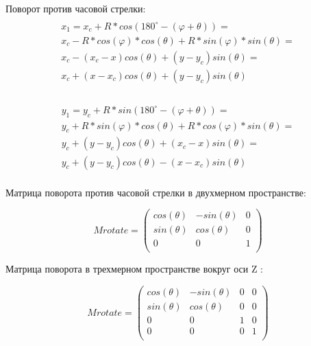 Поворот против часовой стрелки:
\begin{multline}
	\\
	x_1 = x_c + R*cos(180^{\circ}-(\varphi +  \theta)) = \\
	x_c - R*cos(\varphi)*cos(\theta) + R*sin(\varphi)*sin(\theta) = \\
	x_c - (x_c - x)cos(\theta) + (y - y_c)sin(\theta) = \\
	x_c + (x - x_c)cos(\theta) + (y - y_c)sin(\theta) \\
\end{multline}

\begin{multline}
	\\
	y_1 = y_c + R*sin(180^{\circ}-(\varphi +  \theta)) = \\
	y_c + R*sin(\varphi)*cos(\theta) + R*cos(\varphi)*sin(\theta) = \\
	y_c + (y - y_c)cos(\theta) + (x_c- x)sin(\theta) = \\
	y_c + (y - y_c)cos(\theta) - (x - x_c)sin(\theta) \\
\end{multline}

Матрица поворота против часовой стрелки в двухмерном пространстве:

\begin{equation}
	Mrotate = \left(
	\begin{array}{cccc}
			cos(\theta) & -sin(\theta) & 0 \\
			sin(\theta) & cos(\theta)  & 0 \\
			0           & 0            & 1 \\
		\end{array}
	\right)
\end{equation}

Матрица поворота в трехмерном пространстве вокруг оси Z :

\begin{equation}
	Mrotate = \left(
	\begin{array}{cccc}
			cos(\theta) & -sin(\theta) & 0 & 0 \\
			sin(\theta) & cos(\theta)  & 0 & 0 \\
			0           & 0            & 1 & 0 \\
			0           & 0            & 0 & 1 \\
		\end{array}
	\right)
\end{equation}

\newpage

